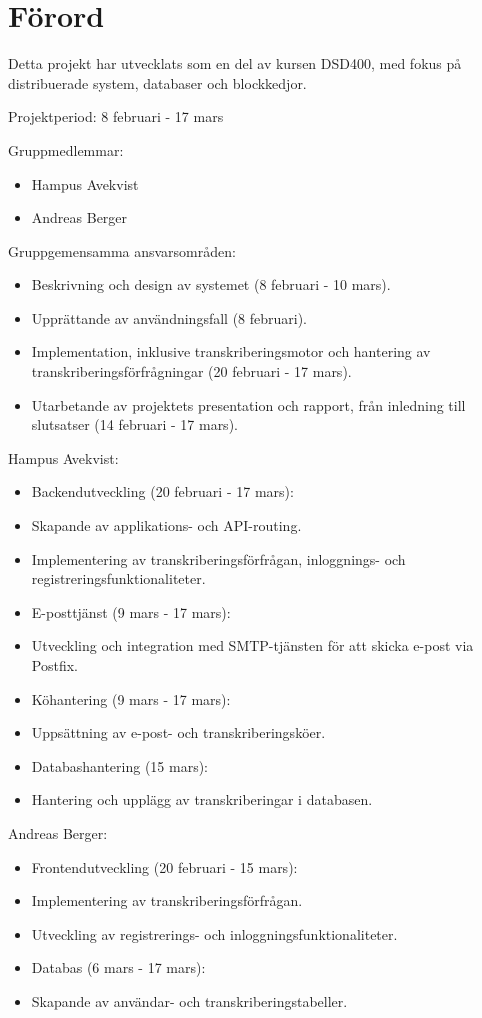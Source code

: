 \thispagestyle{plain}

\section{Förord}
Detta projekt har utvecklats som en del av kursen DSD400, med fokus på distribuerade system, databaser och blockkedjor.

Projektperiod: 8 februari - 17 mars

Gruppmedlemmar:
\begin{itemize}
    \item Hampus Avekvist
    \item Andreas Berger
\end{itemize}

Gruppgemensamma ansvarsområden:
\begin{itemize}
    \item Beskrivning och design av systemet (8 februari - 10 mars).
    \item Upprättande av användningsfall (8 februari).
    \item Implementation, inklusive transkriberingsmotor och hantering av transkriberingsförfrågningar (20 februari - 17 mars).
    \item Utarbetande av projektets presentation och rapport, från inledning till slutsatser (14 februari - 17 mars).
\end{itemize}

Hampus Avekvist:
\begin{itemize}
    \item Backendutveckling (20 februari - 17 mars):
    \item Skapande av applikations- och API-routing.
    \item Implementering av transkriberingsförfrågan, inloggnings- och registreringsfunktionaliteter.
    \item E-posttjänst (9 mars - 17 mars):
    \item Utveckling och integration med SMTP-tjänsten för att skicka e-post via Postfix.
    \item Köhantering (9 mars - 17 mars):
    \item Uppsättning av e-post- och transkriberingsköer.
    \item Databashantering (15 mars):
    \item Hantering och upplägg av transkriberingar i databasen.
\end{itemize}

Andreas Berger:
\begin{itemize}
    \item Frontendutveckling (20 februari - 15 mars):
    \item Implementering av transkriberingsförfrågan.
    \item Utveckling av registrerings- och inloggningsfunktionaliteter.
    \item Databas (6 mars - 17 mars):
    \item Skapande av användar- och transkriberingstabeller.
\end{itemize}
